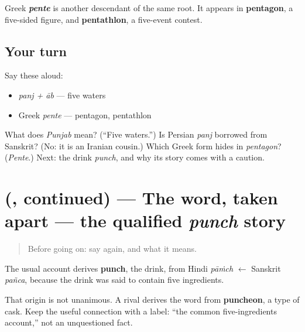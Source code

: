 \begin{cousinweb}
Greek \emph{\textbf{pente}} is another descendant of the same root. It appears in \textbf{pentagon}, a five-sided figure, and \textbf{pentathlon}, a five-event contest.
\end{cousinweb}

\subsection*{Your turn}
Say these aloud:

\begin{itemize}
\raggedright
  \item \emph{panj + āb} — five waters
  \item Greek \emph{pente} — pentagon, pentathlon
\end{itemize}

\begin{tcolorbox}[breakable,colback=teal!4,colframe=teal!35!black,title={Before you move on}]
What does \emph{Punjab} mean? (“Five waters.”) Is Persian \emph{panj} borrowed from Sanskrit? (No: it is an Iranian cousin.) Which Greek form hides in \emph{pentagon}? (\emph{Pente}.) Next: the drink \emph{punch}, and why its story comes with a caution.
\end{tcolorbox}
\section[\texorpdfstring{(\sk{पञ्च}, continued)}{(पञ्च, continued)}]{(, continued) — The word, taken apart — the qualified \emph{punch} story}

\label{lesson:SA-C06-pancha-travels-more}



\begin{quote}
Before going on: say \textbf{} again, and what it means.
\end{quote}

\begin{cousinweb}
The usual account derives \textbf{punch}, the drink, from Hindi \emph{pāṁch} $\leftarrow$ Sanskrit \emph{pañca}, because the drink was said to contain five ingredients.

That origin is not unanimous. A rival derives the word from \textbf{puncheon}, a type of cask. Keep the useful connection with a label: “the common five-ingredients account,” not an unquestioned fact.
\end{cousinweb}

